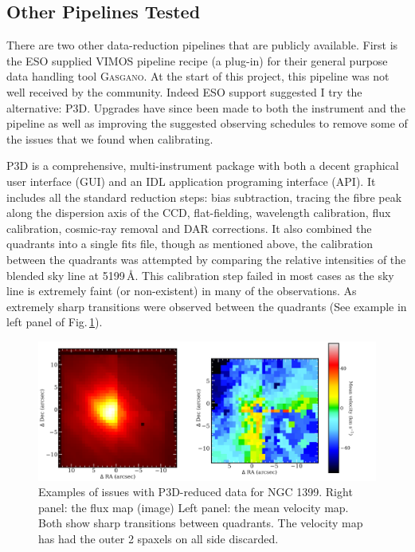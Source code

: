 	\subsection{Other Pipelines Tested}
		\label{subsec:Other}
		There are two other data-reduction pipelines that are publicly available. First is the ESO supplied VIMOS pipeline recipe (a plug-in) for their general purpose data handling tool \textsc{Gasgano}. At the start of this project, this pipeline was not well received by the community. Indeed ESO support suggested I try the alternative: \textsc{P3D}. Upgrades have since been made to both the instrument and the pipeline as well as improving the suggested observing schedules to remove some of the issues that we found when calibrating. 
		
		\textsc{P3D} is a comprehensive, multi-instrument package with both a decent graphical user interface (GUI) and an \textsc{IDL} application programing interface (API). It includes all the standard reduction steps: bias subtraction, tracing the fibre peak along the dispersion axis of the CCD, flat-fielding, wavelength calibration, flux calibration, cosmic-ray removal and DAR corrections. It also combined the quadrants into a single fits file, though as mentioned above, the calibration between the quadrants was attempted by comparing the relative intensities of the blended sky line at 5199\,\AA. This calibration step failed in most cases as the sky line is extremely faint (or non-existent) in many of the observations. As extremely sharp transitions were observed between the quadrants (See example in left panel of Fig.\,\ref{fig:P3D}). 

		\begin{figure}
			\centering
			\includegraphics[width=.9\textwidth]{chapter2/P3D_NGC1399.png}
			\caption[Demonstrating issues with \textsc{P3D}-reduced data]{Examples of issues with \textsc{P3D}-reduced data for NGC 1399. Right panel: the flux map (image) Left panel: the mean velocity map. Both show sharp transitions between quadrants. The velocity map has had the outer 2 spaxels on all side discarded.}
			\label{fig:P3D}
		\end{figure}



